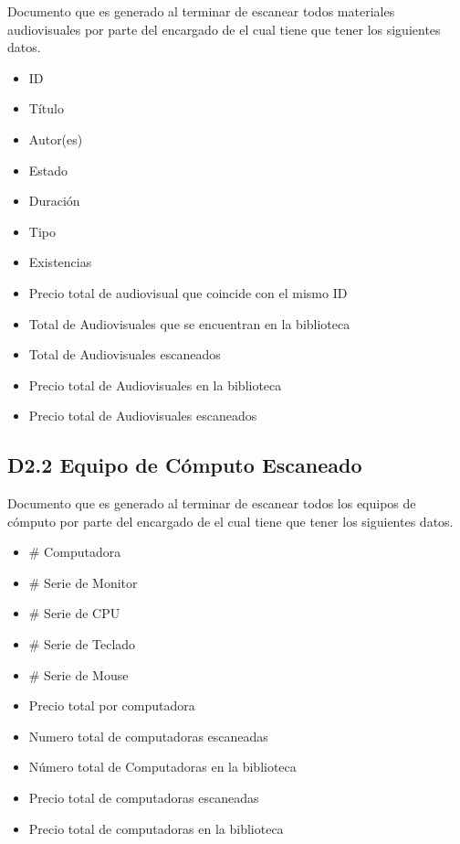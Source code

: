   Documento que es generado al terminar de escanear todos materiales audiovisuales por parte del encargado de   el cual tiene que tener los siguientes datos.
  
  \begin{itemize}
  \item ID 
  \item Título
  \item Autor(es)
  \item Estado
  \item Duración
  \item Tipo
  \item Existencias
  \item Precio total de audiovisual que coincide con el mismo ID
  \item Total de Audiovisuales que se encuentran en la biblioteca
  \item Total de Audiovisuales escaneados
  \item Precio total de Audiovisuales en la biblioteca
  \item Precio total de Audiovisuales escaneados
  \end{itemize}
  
 \subsection{D2.2 Equipo de Cómputo Escaneado}

  Documento que es generado al terminar de escanear todos los equipos de cómputo por parte del encargado de   el cual tiene que tener los siguientes datos.
  
  \begin{itemize}
  \item \# Computadora
  \item \# Serie de Monitor
  \item \# Serie de CPU
  \item \# Serie de Teclado
  \item \# Serie de Mouse
  \item Precio total por computadora
  \item Numero total de computadoras escaneadas
  \item Número total de Computadoras en la biblioteca
  \item Precio total de computadoras escaneadas
  \item Precio total de computadoras en la biblioteca 
  \end{itemize}











